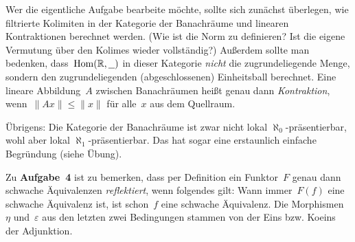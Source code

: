 \documentclass{uebblatt}
\begin{document}
Wer die eigentliche Aufgabe bearbeite möchte, sollte sich zunächst überlegen,
wie filtrierte Kolimiten in der Kategorie der Banachräume und linearen
Kontraktionen berechnet werden. (Wie ist die Norm zu definieren? Ist die eigene
Vermutung über den Kolimes wieder vollständig?) Außerdem sollte man bedenken,
dass~$\mathrm{Hom}(\mathbb{R},\underline{\ \ })$ in dieser Kategorie \emph{nicht} die
zugrundeliegende Menge, sondern den zugrundeliegenden (abgeschlossenen)
Einheitsball berechnet. Eine lineare Abbildung~$A$ zwischen
Banachräumen heißt genau dann \emph{Kontraktion}, wenn~$\|Ax\| \leq \|x\|$ für
alle~$x$ aus dem Quellraum.

Übrigens: Die Kategorie der Banachräume ist zwar nicht lokal
$\aleph_0$-präsentierbar, wohl aber lokal $\aleph_1$-präsentierbar. Das hat
sogar eine erstaunlich einfache Begründung (siehe Übung).

Zu \textbf{Aufgabe~4} ist zu bemerken, dass per Definition ein Funktor~$F$
genau dann schwache Äquivalenzen \emph{reflektiert}, wenn folgendes gilt: Wann
immer~$F(f)$ eine schwache Äquivalenz ist, ist schon~$f$ eine schwache
Äquivalenz. Die Morphismen~$\eta$ und~$\varepsilon$ aus den letzten zwei
Bedingungen stammen von der Eins bzw. Koeins der Adjunktion.
\end{document}
